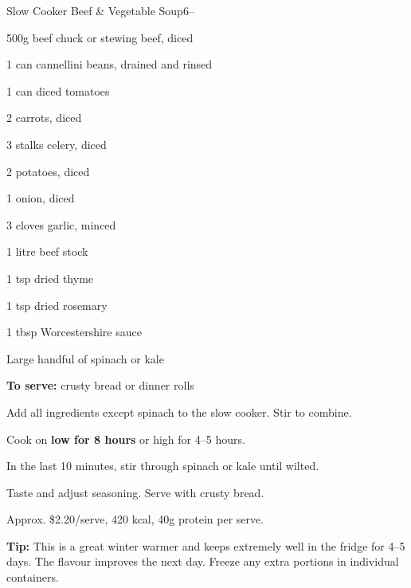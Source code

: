 \begin{recipebox}{Slow Cooker Beef \& Vegetable Soup}{6}{--}
\begin{ingredients}
  \item 500g beef chuck or stewing beef, diced
  \item 1 can cannellini beans, drained and rinsed
  \item 1 can diced tomatoes
  \item 2 carrots, diced
  \item 3 stalks celery, diced
  \item 2 potatoes, diced
  \item 1 onion, diced
  \item 3 cloves garlic, minced
  \item 1 litre beef stock
  \item 1 tsp dried thyme
  \item 1 tsp dried rosemary
  \item 1 tbsp Worcestershire sauce
  \item Large handful of spinach or kale
  \item \textbf{To serve:} crusty bread or dinner rolls
\end{ingredients}

\begin{method}
  \item Add all ingredients except spinach to the slow cooker. Stir to combine.
  \item Cook on \textbf{low for 8 hours} or high for 4--5 hours.
  \item In the last 10 minutes, stir through spinach or kale until wilted.
  \item Taste and adjust seasoning. Serve with crusty bread.
\end{method}

\begin{notelist}
  \item Approx. \$2.20/serve, 420 kcal, 40g protein per serve.
  \item \textbf{Tip:} This is a great winter warmer and keeps extremely well in the fridge for 4--5 days. The flavour improves the next day. Freeze any extra portions in individual containers.
\end{notelist}
\end{recipebox}
